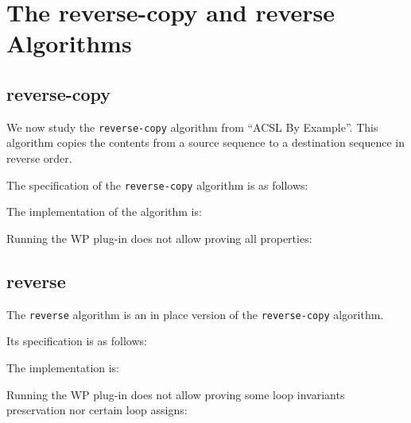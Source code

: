 \clearpage
\section{The \textsf{reverse-copy} and \textsf{reverse} Algorithms}
\label{reversecopy}

\subsection{\textsf{reverse-copy}}

We now study the \texttt{reverse-copy} algorithm from ``ACSL By Example''.
This algorithm copies the contents from a source sequence to a destination
sequence in reverse order.

The specification of the \texttt{reverse-copy} algorithm is as follows:


The implementation of the algorithm is:


Running the \textsf{WP} plug-in does not allow proving all properties:

\subsection{\textsf{reverse}}

The \texttt{reverse} algorithm is an in place version of the
\texttt{reverse-copy} algorithm.

Its specification is as follows:


The implementation is:


Running the \textsf{WP} plug-in does not allow proving some loop invariants
preservation nor certain loop assigns:
